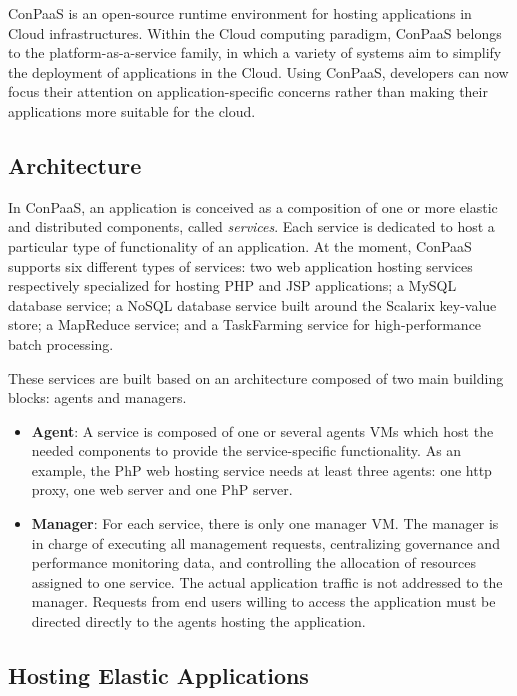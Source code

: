 

ConPaaS is an open-source runtime environment for hosting applications in Cloud infrastructures.
Within the Cloud computing paradigm, ConPaaS belongs to the platform-as-a-service family, 
in which a variety of systems aim to simplify the deployment of applications in the Cloud. Using ConPaaS,  developers can now focus their attention on application-specific concerns rather than making their applications more suitable for the cloud. 

\subsection{Architecture}

In ConPaaS, an application is conceived as a composition of one or more elastic and distributed components, called \emph{services}. Each service is dedicated to host a particular type of functionality of an application. At the moment, ConPaaS supports six different types of services: two web application hosting services respectively specialized for hosting PHP and JSP applications; a MySQL database service; a NoSQL database service built around the Scalarix key-value store; a MapReduce service; and a TaskFarming service for high-performance batch processing.  

These services are built based on an architecture composed of two main building blocks: agents and managers.  

\begin{itemize}
\item \textbf{Agent}: A service is composed of one or several agents VMs which host the needed components to provide the service-specific functionality. As an example, the PhP web hosting service needs at least three agents: one http proxy, one web server and one PhP server.  

\item \textbf{Manager}: For each service, there is only one manager VM. The manager is in charge of executing all management requests, centralizing governance and performance monitoring data, and controlling the allocation of resources assigned to one service. The actual application traffic is not addressed to the manager. Requests from end users willing to access the application must be directed directly to the agents hosting the application.

\end{itemize}

\subsection{Hosting Elastic Applications}

